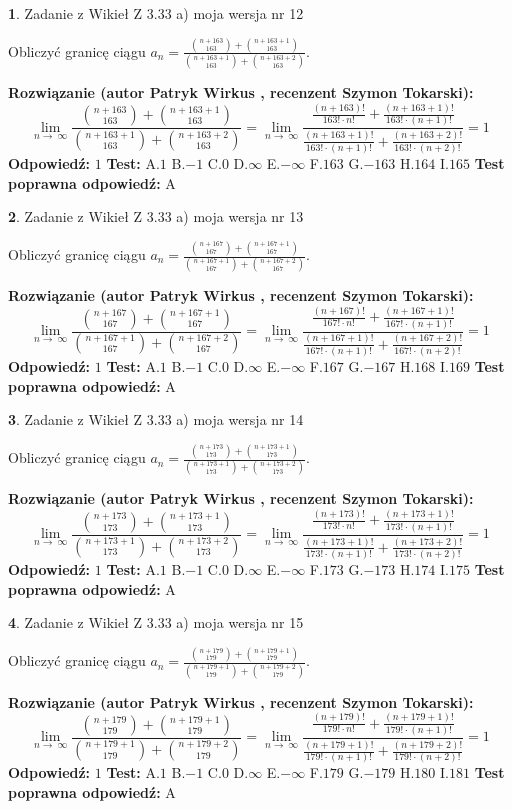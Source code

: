 \documentclass[12pt, a4paper]{article}
\theoremstyle{definition} %
\newtheorem{zad}{}
\newcommand{\zadStart}[1]{\begin{zad}#1\newline}
\newcommand{\zadStop}{\end{zad}}
\newcommand{\rozwStart}[2]{\noindent \textbf{Rozwiązanie (autor #1 , recenzent #2): }\newline}
\newcommand{\rozwStop}{\newline}
\newcommand{\odpStart}{\noindent \textbf{Odpowiedź:}\newline}
\newcommand{\odpStop}{\newline}
\newcommand{\testStart}{\noindent \textbf{Test:}\newline}
\newcommand{\testStop}{\newline}
\newcommand{\kluczStart}{\noindent \textbf{Test poprawna odpowiedź:}\newline}
\newcommand{\kluczStop}{\newline}
\begin{document}
\zadStart{Zadanie z Wikieł Z 3.33 a) moja wersja nr 12}

Obliczyć granicę ciągu $a_{n}=\frac{{n+163\choose163}+{n+163+1\choose163}}{{n+163+1\choose163}+{n+163+2\choose163}}$.
\zadStop
\rozwStart{Patryk Wirkus}{Szymon Tokarski}
$$\lim\limits_{n\to\ \infty}\frac{{n+163\choose163}+{n+163+1\choose163}}{{n+163+1\choose163}+{n+163+2\choose163}} = \lim\limits_{n\to\ \infty}\frac{\frac{(n+163)!}{163! \cdot n!}+\frac{(n+163+1)!}{163! \cdot (n+1)!}}{\frac{(n+163+1)!}{163! \cdot (n+1)!}+\frac{(n+163+2)!}{163! \cdot (n+2)!}} = 1$$
\rozwStop
\odpStart
$1$
\odpStop
\testStart
A.$1$ B.$-1$ C.$0$ D.$\infty$ E.$-\infty$
F.$163$ G.$-163$
H.$164$
I.$165$
\testStop
\kluczStart
A
\kluczStop



\zadStart{Zadanie z Wikieł Z 3.33 a) moja wersja nr 13}

Obliczyć granicę ciągu $a_{n}=\frac{{n+167\choose167}+{n+167+1\choose167}}{{n+167+1\choose167}+{n+167+2\choose167}}$.
\zadStop
\rozwStart{Patryk Wirkus}{Szymon Tokarski}
$$\lim\limits_{n\to\ \infty}\frac{{n+167\choose167}+{n+167+1\choose167}}{{n+167+1\choose167}+{n+167+2\choose167}} = \lim\limits_{n\to\ \infty}\frac{\frac{(n+167)!}{167! \cdot n!}+\frac{(n+167+1)!}{167! \cdot (n+1)!}}{\frac{(n+167+1)!}{167! \cdot (n+1)!}+\frac{(n+167+2)!}{167! \cdot (n+2)!}} = 1$$
\rozwStop
\odpStart
$1$
\odpStop
\testStart
A.$1$ B.$-1$ C.$0$ D.$\infty$ E.$-\infty$
F.$167$ G.$-167$
H.$168$
I.$169$
\testStop
\kluczStart
A
\kluczStop



\zadStart{Zadanie z Wikieł Z 3.33 a) moja wersja nr 14}

Obliczyć granicę ciągu $a_{n}=\frac{{n+173\choose173}+{n+173+1\choose173}}{{n+173+1\choose173}+{n+173+2\choose173}}$.
\zadStop
\rozwStart{Patryk Wirkus}{Szymon Tokarski}
$$\lim\limits_{n\to\ \infty}\frac{{n+173\choose173}+{n+173+1\choose173}}{{n+173+1\choose173}+{n+173+2\choose173}} = \lim\limits_{n\to\ \infty}\frac{\frac{(n+173)!}{173! \cdot n!}+\frac{(n+173+1)!}{173! \cdot (n+1)!}}{\frac{(n+173+1)!}{173! \cdot (n+1)!}+\frac{(n+173+2)!}{173! \cdot (n+2)!}} = 1$$
\rozwStop
\odpStart
$1$
\odpStop
\testStart
A.$1$ B.$-1$ C.$0$ D.$\infty$ E.$-\infty$
F.$173$ G.$-173$
H.$174$
I.$175$
\testStop
\kluczStart
A
\kluczStop



\zadStart{Zadanie z Wikieł Z 3.33 a) moja wersja nr 15}

Obliczyć granicę ciągu $a_{n}=\frac{{n+179\choose179}+{n+179+1\choose179}}{{n+179+1\choose179}+{n+179+2\choose179}}$.
\zadStop
\rozwStart{Patryk Wirkus}{Szymon Tokarski}
$$\lim\limits_{n\to\ \infty}\frac{{n+179\choose179}+{n+179+1\choose179}}{{n+179+1\choose179}+{n+179+2\choose179}} = \lim\limits_{n\to\ \infty}\frac{\frac{(n+179)!}{179! \cdot n!}+\frac{(n+179+1)!}{179! \cdot (n+1)!}}{\frac{(n+179+1)!}{179! \cdot (n+1)!}+\frac{(n+179+2)!}{179! \cdot (n+2)!}} = 1$$
\rozwStop
\odpStart
$1$
\odpStop
\testStart
A.$1$ B.$-1$ C.$0$ D.$\infty$ E.$-\infty$
F.$179$ G.$-179$
H.$180$
I.$181$
\testStop
\kluczStart
A
\kluczStop
\end{document}

